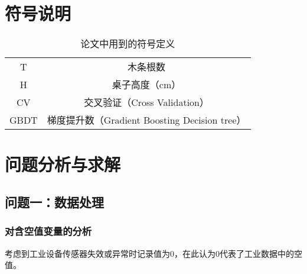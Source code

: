 \documentclass[bwprint]{gmcmthesis}
\begin{document}
\FloatBarrier
\section{符号说明}


\begin{table}[hp]
    \centering
    \caption{论文中用到的符号定义}
	\begin{tabular}{cc}
	\toprule
	 \makebox[0.4\textwidth][c]{符号}	&  \makebox[0.5\textwidth][c]{意义} \\ 
	 \midrule
	 T	    & 木条根数   \\
	 H	    & 桌子高度（cm）  \\
	 \midrule
	 CV	    & 交叉验证（Cross Validation） \\
	 GBDT	& 梯度提升数（Gradient Boosting Decision tree）  \\ 
	 \bottomrule
	\end{tabular}
    \label{tab:addlabel}%
\end{table}%




\FloatBarrier
\section{问题分析与求解}
\FloatBarrier
\subsection{问题一：数据处理}


%
%


\FloatBarrier
\subsubsection{对含空值变量的分析}\label{sec:empty-analyze}

考虑到工业设备传感器失效或异常时记录值为0，在此认为0代表了工业数据中的空值。
\end{document}
